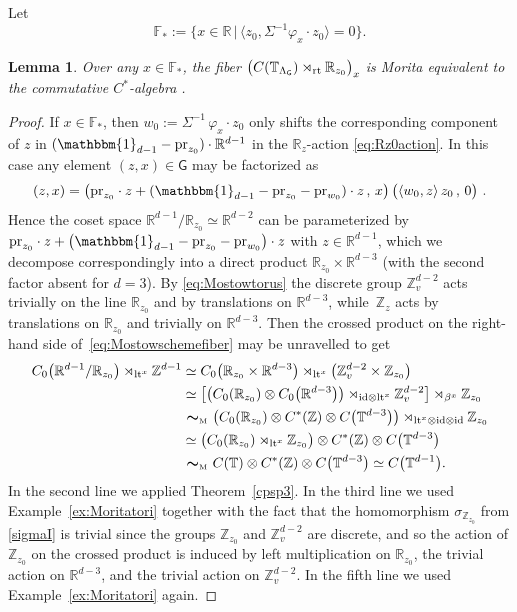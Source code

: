 \documentclass[10pt,a4paper]{amsart}
\numberwithin{equation}{section}
\newcommand{\Z}{\zed}
\newcommand{\mbf}[1]{{\boldsymbol {#1} }}
\def\Id{{\rm id}}
\newcommand{\unit}{\mathbbm{1}} 			%
\newcommand{\sfG}{\mathsf{G}}
\newcommand{\lt}{{\rm lt}}
\newcommand{\rt}{{\rm rt}}
\newcommand{\R}{\real}
\newcommand{\zed}{{\mathbb Z}} %
\newcommand{\real}{{\mathbb R}} %
\newcommand{\torus}{{\mathbb T}} %
\newcommand{\proj}{{\rm pr}}
\newtheorem{Lemma}[Theorem]{Lemma}
\begin{document}
Let
\[
\mathbb{F}_* := \big\{x\in\R \, \big| \, \big\langle
z_0,\Sigma^{-1} \varphi_x\cdot z_0\big\rangle=0\big\} .
\]
\begin{Lemma}\label{lem:ellfibercom}
Over any $x\in \mathbb{F}_*$, the fiber
$\big(C(\torus_{\Lambda_\sfG})\rtimes_\rt\real_{ z_0}\big)_x$
is Morita equivalent to the
commutative $C^*$-algebra \smash{$C\big(\torus^{d-1}\big)$}.
\end{Lemma}
\begin{proof}
If $x\in\mathbb{F}_*$, then $w_0:=\Sigma^{-1}\,\varphi_x\cdot z_0$ only
shifts the corresponding component of $ z$ in
$(\unit_{d-1}-\proj_{ z_0})\cdot\R^{d-1}$ in the $\R_{z}$-action
\eqref{eq:Rz0action}. In this case any
element $(z,x)\in\sfG$ may be factorized as
$$
(z,x) = \big(\proj_{ z_0}\cdot
z+(\unit_{d-1}-\proj_{z_0}-\proj_{w_0})\cdot z\,,\,x\big) \,
\big(\langle w_0,z\rangle\, z_0 \,,\,0\big) \ .
$$
Hence the coset space $\R^{d-1}/\R_{ z_0}\simeq\R^{d-2}$ can be
parameterized by $\proj_{ z_0}\cdot
z+\big(\unit_{d-1}-\proj_{z_0}-\proj_{w_0}\big)\cdot z$ with $z\in\R^{d-1}$,
which we decompose correspondingly into a direct product
$\R_{z_0}\times\R^{d-3}$ (with the second factor absent for $d=3$). By \eqref{eq:Mostowtorus} the discrete group
$\Z_v^{d-2}$ acts trivially on the line $\R_{z_0}$ and by translations
on $\R^{d-3}$,
while~$\Z_{ z}$ acts by translations on $\R_{z_0}$ and trivially
on $\R^{d-3}$. Then the crossed product on the right-hand side of~\eqref{eq:Mostowschemefiber} may be unravelled to get
\begin{align*}
C_0\big(\real^{d-1}/\R_{ z_0}\big)\rtimes_{\lt^x}\Z^{d-1}
&\simeq C_0\big(\R_{
 z_0}\times\R^{d-3}\big)\rtimes_{\lt^x}\big(\Z_v^{d-2}\times\Z_{ z_0}\big) \\
&\simeq
\big[\big(C_0(\R_{z_0})\otimes C_0\big(\R^{d-3}\big)\big)\rtimes_{\Id\otimes\lt^x}\Z^{d-2}_v\big]\rtimes_{\beta^x}\Z_{z_0} \\
& \ \mbf\sim_{\text{\tiny M}} \ \big(C_0(\R_{ z_0})\otimes C^*(\Z)\otimes C\big(\torus^{d-3}\big)\big)\rtimes_{\lt^x\otimes\Id\otimes\Id}\Z_{ z_0}
 \\
&\simeq \big(C_0(\R_{ z_0})\rtimes_{\lt^x}\Z_{ z_0}\big)\otimes
C^*(\Z)\otimes C\big(\torus^{d-3}\big)
\nonumber\\
& \ \mbf\sim_{\text{\tiny M}} \ C(\torus)\otimes C^*(\Z)\otimes C\big(\torus^{d-3}\big) \simeq C\big(\torus^{d-1}\big) .
\end{align*}
In the second line we applied
Theorem~\ref{cpsp3}. In the third line we used
Example~\ref{ex:Moritatori} together with the fact that the
homomorphism $\sigma_{\Z_{ z_0}}$ from \eqref{sigmaI} is trivial since the
groups $\Z_{ z_0}$ and $\Z_v^{d-2}$ are discrete, and so the action of $\Z_{ z_0}$ on the crossed
product is induced by left multiplication on $\R_{ z_0}$, the trivial
action on $\R^{d-3}$, and the
trivial action on $\Z_v^{d-2}$. In the fifth line we used
Example~\ref{ex:Moritatori} again.
\end{proof}
\end{document}
